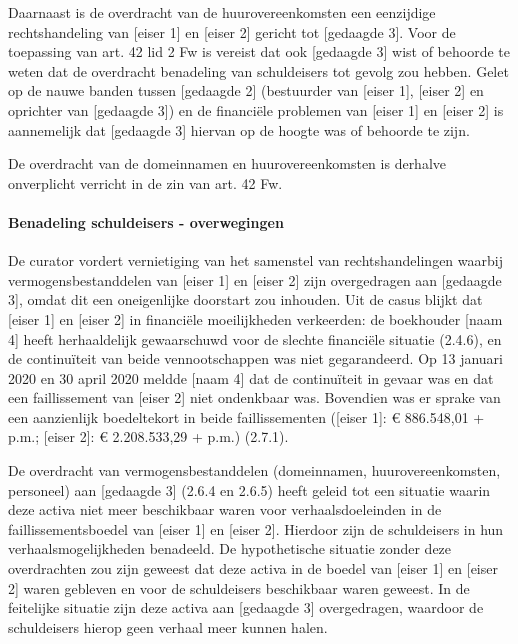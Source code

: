\documentclass[
  dutch,
  a4paper,
]{article}
\begin{document}
Daarnaast is de overdracht van de huurovereenkomsten een eenzijdige rechtshandeling van {[}eiser 1{]} en {[}eiser 2{]} gericht tot {[}gedaagde 3{]}. Voor de toepassing van art. 42 lid 2 Fw is vereist dat ook {[}gedaagde 3{]} wist of behoorde te weten dat de overdracht benadeling van schuldeisers tot gevolg zou hebben. Gelet op de nauwe banden tussen {[}gedaagde 2{]} (bestuurder van {[}eiser 1{]}, {[}eiser 2{]} en oprichter van {[}gedaagde 3{]}) en de financiële problemen van {[}eiser 1{]} en {[}eiser 2{]} is aannemelijk dat {[}gedaagde 3{]} hiervan op de hoogte was of behoorde te zijn.

De overdracht van de domeinnamen en huurovereenkomsten is derhalve onverplicht verricht in de zin van art. 42 Fw.

\paragraph{Benadeling schuldeisers - overwegingen}\label{benadeling-schuldeisers---overwegingen-24}

De curator vordert vernietiging van het samenstel van rechtshandelingen waarbij vermogensbestanddelen van {[}eiser 1{]} en {[}eiser 2{]} zijn overgedragen aan {[}gedaagde 3{]}, omdat dit een oneigenlijke doorstart zou inhouden. Uit de casus blijkt dat {[}eiser 1{]} en {[}eiser 2{]} in financiële moeilijkheden verkeerden: de boekhouder {[}naam 4{]} heeft herhaaldelijk gewaarschuwd voor de slechte financiële situatie (2.4.6), en de continuïteit van beide vennootschappen was niet gegarandeerd. Op 13 januari 2020 en 30 april 2020 meldde {[}naam 4{]} dat de continuïteit in gevaar was en dat een faillissement van {[}eiser 2{]} niet ondenkbaar was. Bovendien was er sprake van een aanzienlijk boedeltekort in beide faillissementen ({[}eiser 1{]}: € 886.548,01 + p.m.; {[}eiser 2{]}: € 2.208.533,29 + p.m.) (2.7.1).

De overdracht van vermogensbestanddelen (domeinnamen, huurovereenkomsten, personeel) aan {[}gedaagde 3{]} (2.6.4 en 2.6.5) heeft geleid tot een situatie waarin deze activa niet meer beschikbaar waren voor verhaalsdoeleinden in de faillissementsboedel van {[}eiser 1{]} en {[}eiser 2{]}. Hierdoor zijn de schuldeisers in hun verhaalsmogelijkheden benadeeld. De hypothetische situatie zonder deze overdrachten zou zijn geweest dat deze activa in de boedel van {[}eiser 1{]} en {[}eiser 2{]} waren gebleven en voor de schuldeisers beschikbaar waren geweest. In de feitelijke situatie zijn deze activa aan {[}gedaagde 3{]} overgedragen, waardoor de schuldeisers hierop geen verhaal meer kunnen halen.
\end{document}
